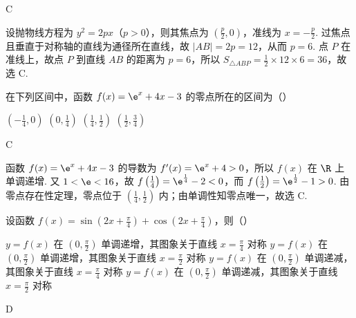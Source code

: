 \begin{answer}
C
\end{answer}

\begin{solution}
设抛物线方程为 \(y^2=2px\)（\(p>0\)），则其焦点为 \(\left(\frac{p}{2},0\right)\)，准线为 \(x=-\frac{p}{2}\). 过焦点且垂直于对称轴的直线为通径所在直线，故 \(\left|AB\right|=2p=12\)，从而 \(p=6\). 点 \(P\) 在准线上，故点 \(P\) 到直线 \(AB\) 的距离为 \(p=6\)，所以 \(S_{\triangle ABP}=\frac{1}{2}\times12\times6=36\)，故选 C.
\end{solution}

\begin{problem}
在下列区间中，函数 \( f(x) = \e^{x} + 4x - 3 \) 的零点所在的区间为（\quad）

\choices
    {\(\left(-\frac{1}{4}, 0\right)\)}
    {\(\left(0, \frac{1}{4}\right)\)}
    {\(\left(\frac{1}{4}, \frac{1}{2}\right)\)}
    {\(\left(\frac{1}{2}, \frac{3}{4}\right)\)}
\end{problem}

\begin{answer}
C
\end{answer}

\begin{solution}
函数 \(f(x)=\e^x+4x-3\) 的导数为 \(f'(x)=\e^x+4>0\)，所以 \(f(x)\) 在 \(\R\) 上单调递增. 又 \(1<\e<16\)，故
\(f\left(\frac{1}{4}\right)=\e^{\frac{1}{4}}-2<0\)，而
\(f\left(\frac{1}{2}\right)=\e^{\frac{1}{2}}-1>0\). 由零点存在性定理，零点位于 \(\left(\frac{1}{4},\frac{1}{2}\right)\) 内；由单调性知零点唯一，故选 C.
\end{solution}

\begin{problem}
设函数 \( f(x) = \sin \left(2x + \frac{\pi}{4}\right) + \cos \left(2x + \frac{\pi}{4}\right) \)，则（\quad）

\choices
    {\(y = f(x)\) 在 \(\left(0, \frac{\pi}{2}\right)\) 单调递增，其图象关于直线 \(x = \frac{\pi}{4}\) 对称}
    {\(y = f(x)\) 在 \(\left(0, \frac{\pi}{2}\right)\) 单调递增，其图象关于直线 \(x = \frac{\pi}{2}\) 对称}
    {\(y = f(x)\) 在 \(\left(0, \frac{\pi}{2}\right)\) 单调递减，其图象关于直线 \(x = \frac{\pi}{4}\) 对称}
    {\( y = f(x) \) 在 \( \left(0, \frac{\pi}{2}\right) \) 单调递减，其图象关于直线 \( x = \frac{\pi}{2} \) 对称}

\end{problem}

\begin{answer}
D
\end{answer}

